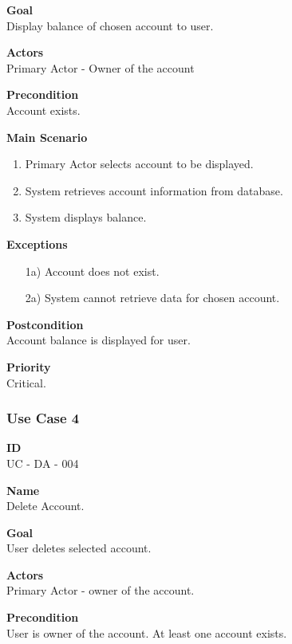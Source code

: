 \documentclass[12pt]{article}
\begin{document}
\noindent
{\bf Goal}\\
Display balance of chosen account to user.

\noindent
{\bf Actors}\\
Primary Actor - Owner of the account

\noindent
{\bf Precondition}\\
Account exists.

\noindent
{\bf Main Scenario}\\
\vspace*{-0.2in}
\begin{enumerate}
\item Primary Actor selects account to be displayed.
  \item System retrieves account information from database.
\item System displays balance.
\end{enumerate}

\noindent
{\bf Exceptions}\\
\vspace*{-0.2in}
\begin{itemize}
\item[1a)] Account does not exist.
\item[2a)] System cannot retrieve data for chosen account.
\end{itemize}

\noindent
{\bf Postcondition}\\
Account balance is displayed for user.

\noindent
{\bf Priority}\\
Critical.

\subsubsection{Use Case 4} \label{uc:4}

\noindent
{\bf ID}\\
UC - DA - 004

\noindent
{\bf Name}\\
Delete Account.

\noindent
{\bf Goal}\\
User deletes selected account.

\noindent
{\bf Actors}\\
Primary Actor - owner of the account.

\noindent
{\bf Precondition}\\
User is owner of the account.
At least one account exists.
\end{document}
